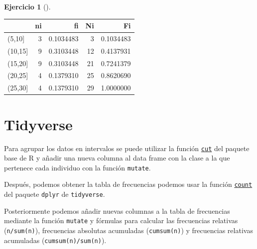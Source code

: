 \documentclass[
  a4paper,
]{scrreport}
\theoremstyle{definition}
\newtheorem{exercise}{Ejercicio}[chapter]
\theoremstyle{remark}
\begin{document}
\begin{exercise}[]
\begin{enumerate}
\begin{tcolorbox}
  \begin{longtable}[]{@{}lrrrr@{}}
  \toprule\noalign{}
  & ni & fi & Ni & Fi \\
  \midrule\noalign{}
  \endhead
  \bottomrule\noalign{}
  \endlastfoot
  (5,10{]} & 3 & 0.1034483 & 3 & 0.1034483 \\
  (10,15{]} & 9 & 0.3103448 & 12 & 0.4137931 \\
  (15,20{]} & 9 & 0.3103448 & 21 & 0.7241379 \\
  (20,25{]} & 4 & 0.1379310 & 25 & 0.8620690 \\
  (25,30{]} & 4 & 0.1379310 & 29 & 1.0000000 \\
  \end{longtable}

  \section{Tidyverse}

  Para agrupar los datos en intervalos se puede utilizar la función
  \href{https://www.rdocumentation.org/packages/base/versions/3.6.2/topics/cut}{\texttt{cut}}
  del paquete base de R y añadir una nueva columna al data frame con la
  clase a la que pertenece cada individuo con la función
  \texttt{mutate}.

  Después, podemos obtener la tabla de frecuencias podemos usar la
  función
  \href{https://aprendeconalf.es/manual-r/06-preprocesamiento.html\#conteo-del-n\%C3\%BAmero-de-observaciones}{\texttt{count}}
  del paquete \texttt{dplyr} de \texttt{tidyverse}.

  Posteriormente podemos añadir nuevas columnas a la tabla de
  frecuencias mediante la función \texttt{mutate} y fórmulas para
  calcular las frecuencias relativas (\texttt{n/sum(n)}), frecuencias
  absolutas acumuladas (\texttt{cumsum(n)}) y frecuencias relativas
  acumuladas (\texttt{cumsum(n)/sum(n)}).


\end{tcolorbox}
\end{enumerate}
\end{exercise}
\end{document}
